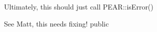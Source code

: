 \begin{DoxyRefList}
Ultimately, this should just call P\-E\-A\-R\-::is\-Error()  
\item[\label{todo__todo000025}%
\hypertarget{todo__todo000025}{}%
Global \hyperlink{classskin_import_export_abdd5d98152684096f0049a7c159bf269}{skin\-Import\-Export\-:\-:import\-All\-App\-Templates} ()]See Matt, this needs fixing!  public 
\end{DoxyRefList}